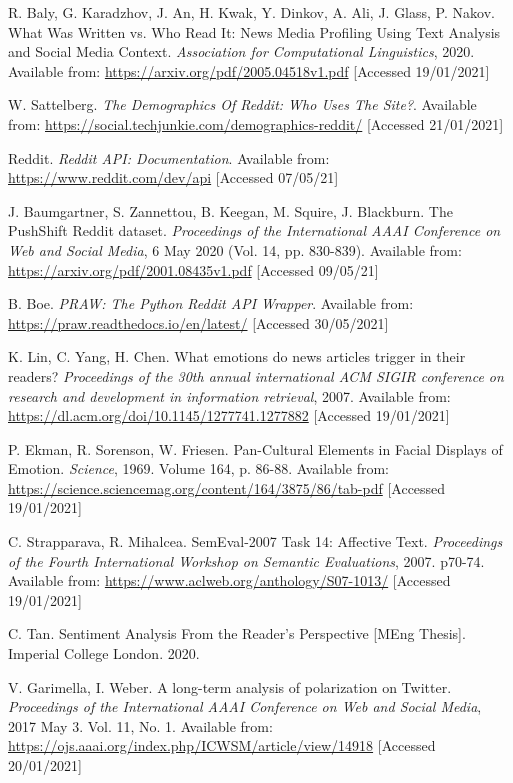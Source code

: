 \begin{thebibliography}{9}
R. Baly, G. Karadzhov, J. An, H. Kwak, Y. Dinkov, A. Ali, J. Glass, P. Nakov. What Was Written vs. Who Read It:
News Media Profiling Using Text Analysis and Social Media Context. \textit{Association for Computational Linguistics}, 2020. Available from: \url{https://arxiv.org/pdf/2005.04518v1.pdf} [Accessed 19/01/2021]

W. Sattelberg. \textit{The Demographics Of Reddit: Who Uses The Site?}. Available from: \url{https://social.techjunkie.com/demographics-reddit/} [Accessed 21/01/2021]

Reddit. \textit{Reddit API: Documentation}. Available from: \url{https://www.reddit.com/dev/api} [Accessed 07/05/21]

J. Baumgartner, S. Zannettou, B. Keegan, M. Squire, J. Blackburn. The PushShift Reddit dataset. \textit{Proceedings of the International AAAI Conference on Web and Social Media}, 6 May 2020 (Vol. 14, pp. 830-839). Available from: \url{https://arxiv.org/pdf/2001.08435v1.pdf} [Accessed 09/05/21]

B. Boe. \textit{PRAW: The Python Reddit API Wrapper}. Available from: \url{https://praw.readthedocs.io/en/latest/} [Accessed 30/05/2021]

K. Lin, C. Yang, H. Chen. What emotions do news articles trigger in their readers? \textit{Proceedings of the 30th annual international ACM SIGIR conference on research and development in information retrieval}, 2007. Available from: \url{https://dl.acm.org/doi/10.1145/1277741.1277882} [Accessed 19/01/2021]

P. Ekman, R. Sorenson, W. Friesen. Pan-Cultural Elements in Facial Displays of Emotion. \textit{Science}, 1969. Volume 164, p. 86-88. Available from: \url{https://science.sciencemag.org/content/164/3875/86/tab-pdf} [Accessed 19/01/2021]

C. Strapparava, R. Mihalcea. SemEval-2007 Task 14: Affective Text. \textit{Proceedings of the Fourth International Workshop on Semantic Evaluations}, 2007. p70-74. Available from: \url{https://www.aclweb.org/anthology/S07-1013/} [Accessed 19/01/2021]

C. Tan. Sentiment Analysis From the Reader’s Perspective [MEng Thesis]. Imperial College London. 2020.

V. Garimella, I. Weber. A long-term analysis of polarization on Twitter. \textit{Proceedings of the International AAAI Conference on Web and Social Media}, 2017 May 3. Vol. 11, No. 1. Available from: \url{https://ojs.aaai.org/index.php/ICWSM/article/view/14918} [Accessed 20/01/2021]


\end{thebibliography}
